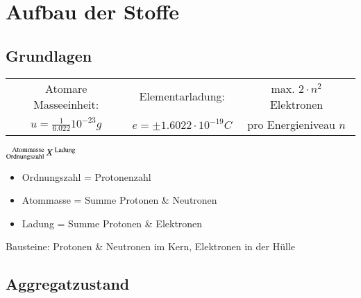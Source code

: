 \section{Aufbau der Stoffe}

\subsection{Grundlagen}
\begin{center}
    \begin{tabular}{|c|c|c|}\hline
        Atomare Masseeinheit:               & Elementarladung:         & max. $2 \cdot n^{2}$ Elektronen \\ 
        $u = \frac{1}{6.022}10^{-23}g$      & $e = \pm 1.6022 \cdot 10^{-19}C$ & pro Energieniveau $n$ \\ \hline
    \end{tabular}
\end{center}


\begin{minipage}{0.25\linewidth}
    $ \prescript{\text{Atommasse }}{\text{Ordnungszahl }}{X}^{\text{ Ladung}} $
\end{minipage}
\hfill
\begin{minipage}{0.65\linewidth}
    \begin{itemize}[itemsep=1pt, parsep=0pt]
        \item Ordnungszahl = Protonenzahl
        \item Atommasse = Summe Protonen \& Neutronen
        \item Ladung = Summe Protonen \& Elektronen
    \end{itemize}
\end{minipage}

Bausteine: Protonen \& Neutronen im Kern, Elektronen in der Hülle

\subsection{Aggregatzustand}		

